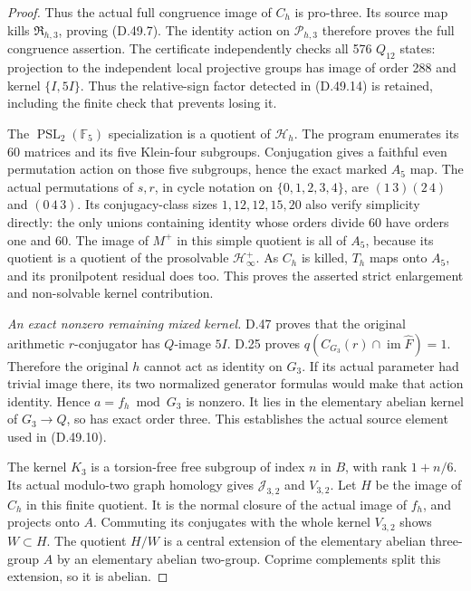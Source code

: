 \begin{proof}
Thus the actual full congruence image of \(C_h\)
is pro-three. Its source map kills
\(\mathfrak R_{h,3}\), proving (D.49.7).
The identity action on \(\mathcal P_{h,3}\)
therefore proves the full congruence assertion.
The certificate independently checks all 576
\(Q_{12}\) states: projection to the independent
local projective groups has image of order 288
and kernel \(\{I,5I\}\). Thus the relative-sign
factor detected in (D.49.14) is retained, including
the finite check that prevents losing it.

The \(\operatorname{PSL}_2(\mathbb F_5)\) specialization
is a quotient of \(\mathcal H_h\). The program
enumerates its 60 matrices and its five Klein-four
subgroups. Conjugation gives a faithful even
permutation action on those five subgroups, hence
the exact marked \(A_5\) map. The actual permutations
of \(s,r\), in cycle notation on \(\{0,1,2,3,4\}\), are
\((1\,3)(2\,4)\) and \((0\,4\,3)\).
Its conjugacy-class sizes \(1,12,12,15,20\)
also verify simplicity directly: the only unions
containing identity whose orders divide 60 have
orders one and 60. The image of \(M^+\) in this
simple quotient is all of \(A_5\), because its
quotient is a quotient of the prosolvable
\(\mathcal H^+_\infty\). As \(C_h\) is killed,
\(T_h\) maps onto \(A_5\), and its pronilpotent
residual does too. This proves the asserted strict
enlargement and non-solvable kernel contribution.

\emph{An exact nonzero remaining mixed kernel.}
D.47 proves that the original arithmetic
\(r\)-conjugator has \(Q\)-image \(5I\).
D.25 proves
\(q(C_{G_3}(r)\cap\operatorname{im}\widehat F)=1\).
Therefore the original \(h\) cannot act as identity
on \(G_3\). If its actual parameter had trivial
image there, its two normalized generator formulas
would make that action identity. Hence
\(a=f_h\bmod G_3\) is nonzero. It lies in the
elementary abelian kernel of \(G_3\to Q\), so
has exact order three. This establishes the actual
source element used in (D.49.10).

The kernel \(K_3\) is a torsion-free free subgroup
of index \(n\) in \(B\), with rank \(1+n/6\).
Its actual modulo-two graph homology gives
\(\mathcal J_{3,2}\) and \(V_{3,2}\).
Let \(H\) be the image of \(C_h\) in this finite
quotient. It is the normal closure of the actual
image of \(f_h\), and projects onto \(A\).
Commuting its conjugates with the whole kernel
\(V_{3,2}\) shows \(W\subset H\).
The quotient \(H/W\) is a central extension of
the elementary abelian three-group \(A\) by an
elementary abelian two-group. Coprime complements
split this extension, so it is abelian.


\end{proof}
